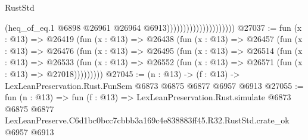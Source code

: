 \begin{lexlean}{RustStd}
\begin{coremodule}
                                            (heq_of_eq.{1}
                                              @6898
                                              @26961
                                              @26964
                                              @6913)))))))))))))))))))))
@27037 := fun (x : @13) =>
  @26419
    (fun (x : @13) =>
    @26438
      (fun (x : @13) =>
      @26457
        (fun (x : @13) =>
        @26476
          (fun (x : @13) =>
          @26495
            (fun (x : @13) =>
            @26514
              (fun (x : @13) =>
              @26533
                (fun (x : @13) => @26552 (fun (x : @13) => @26571 (fun (x : @13) => @27018)))))))))
@27045 := (n : @13) -> (f : @13) -> LexLeanPreservation.Rust.FunSem @6873 @6875 @6877 @6957 @6913
@27055 := fun (n : @13) =>
  fun (f : @13) =>
  LexLeanPreservation.Rust.simulate
    @6873
    @6875
    @6877
    LexLeanPreserve.C6d1bc0bcc7cbbb3a169c4e838883ff45.R32.RustStd.crate_ok
    @6957
    @6913
\end{coremodule}
\end{lexlean}
